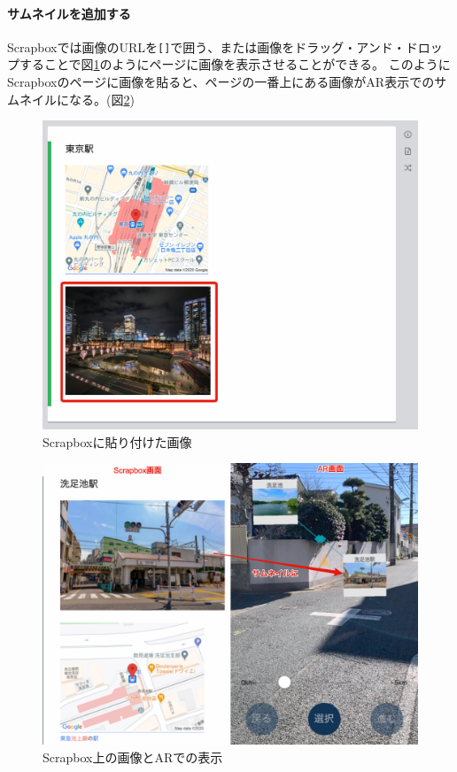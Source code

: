 \paragraph*{サムネイルを追加する}
Scrapboxでは画像のURLを\texttt{[]}で囲う、または画像をドラッグ・アンド・ドロップすることで図\ref{fig:scrapbox_thumbnail}のようにページに画像を表示させることができる。
このようにScrapboxのページに画像を貼ると、ページの一番上にある画像がAR表示でのサムネイルになる。(図\ref{fig:scrapbox_thumbnail_and_ar})

\begin{figure}[h]
  \centering
  \includegraphics[width=120mm]{images/scrapbox_thumbnail.png}
  \caption{Scrapboxに貼り付けた画像} \label{fig:scrapbox_thumbnail}
\end{figure}

\begin{figure}[h]
  \centering
  \includegraphics[width=120mm]{images/scrapbox_thumbnail_and_ar.png}
  \caption{Scrapbox上の画像とARでの表示} \label{fig:scrapbox_thumbnail_and_ar}
\end{figure}

